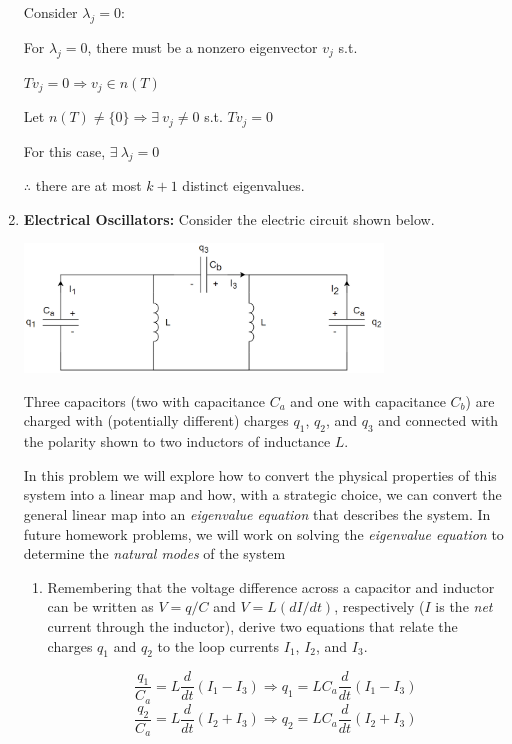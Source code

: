 \documentclass[fleqn]{article}
\begin{document}
\begin{enumerate}[nolistsep]
			\pagebreak
			Consider $\lambda_j = 0$:
			
			For $\lambda_j=0$, there must be a nonzero eigenvector $v_j$ s.t.
			
			$Tv_j = 0 \Rightarrow v_j \in n(T)$
			
			Let $n(T) \neq \{0\} \Rightarrow \exists\ v_j \neq 0$ s.t. $Tv_j = 0$
			
			For this case, $\exists\ \lambda_j = 0$
			
			$\therefore$ there are at most $k + 1$ distinct eigenvalues.
		
		\item \textbf{Electrical Oscillators:} Consider the electric circuit shown below.
		
			{\centering
				\includegraphics[width=0.75\textwidth]{Homework4_Circuit_Sowatzke.png}
			\par}
			
			Three capacitors (two with capacitance $C_a$ and one with capacitance $C_b$) are charged with (potentially different) charges $q_1$, $q_2$, and $q_3$ and connected with the polarity shown to two inductors of inductance $L$.
			
			In this problem we will explore how to convert the physical properties of this system into a linear map and how, with a strategic choice, we can convert the general linear map into an \textit{eigenvalue equation} that describes the system. In future homework problems, we will work on solving the \textit{eigenvalue equation} to determine the \textit{natural modes} of the system
			
			\begin{enumerate}[nolistsep]
				\item Remembering that the voltage difference across a capacitor and inductor can be written as $V=q/C$ and $V=L(dI/dt)$, respectively ($I$ is the \textit{net} current through the inductor), derive two equations that relate the charges $q_1$ and $q_2$ to the loop currents $I_1$, $I_2$, and $I_3$.
				
					\pagebreak
					\begin{equation*}
						\frac{q_1}{C_a} = L\frac{d}{dt}(I_1 - I_3)\Rightarrow q_1 = LC_a\frac{d}{dt}(I_1 - I_3)
					\end{equation*}
					\begin{equation*}
						\frac{q_2}{C_a} = L\frac{d}{dt}(I_2 + I_3) \Rightarrow q_2 = LC_a\frac{d}{dt}(I_2 + I_3)
					\end{equation*}
				

\end{enumerate}
\end{enumerate}
\end{document}
